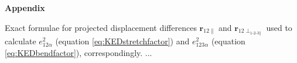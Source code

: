 \documentclass[10pt]{article}
\begin{document}
\vskip 30pt

\noindent
{\bf Appendix}

\vskip 5pt 

Exact formulae for projected displacement differences $\boldsymbol{r}_{12\parallel}$ and $\boldsymbol{r}_{12\perp_{\textrm{1-2-3}\parallel}}$ 
used to calculate $e^2_{12\alpha}$ (equation \ref{eq:KEDstretchfactor}) and $e^2_{123\alpha}$ (equation \ref{eq:KEDbendfactor}), correspondingly.
...


%


\end{document}
